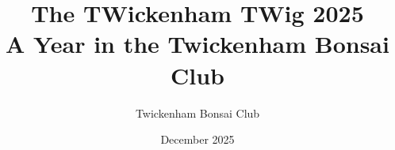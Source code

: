 \documentclass[twoside,openright]{book}
\begin{document}
    \pagestyle{empty}
    \title{%
        \vspace*{5.0em}%
        {\sffamily\Huge The \textcolor{TWRed}{TW}ickenham \textcolor{TWRed}{TW}ig 2025}\\%
        {\sffamily\Large A Year in the Twickenham Bonsai Club}\\%
        \vspace*{20.0em}%
    }
    \author{{\Large Twickenham Bonsai Club}}
    \date{December 2025}
    \maketitle
    

    \frontmatter

    

    

    \hypersetup{linkcolor=black}
    \tableofcontents
    \hypersetup{linkcolor=TWRed}

    \mainmatter
    
    
    
    
    
    
    
    
    
    
    
    
\end{document}
